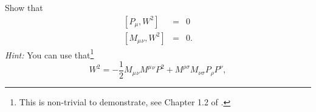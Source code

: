 \documentclass[notes.tex]{subfiles}
\begin{document}
\begin{Exercise}[]
Show that
\begin{eqnarray}
\left[P_\mu, W^2\right] &=& 0 \\
\left[M_\mu{}_\nu, W^2\right] &=& 0.
\end{eqnarray}
{\it Hint:} You can use that\footnote{This is non-trivial to demonstrate, see Chapter 1.2 of \cite{IntrSUSY2010}.}
 \[W^2 = -\frac{1}{2} M_\mu{}_\nu M^{\mu}{}^{\nu}P^2 + M^{\rho\sigma}M_{\nu\sigma}P_\rho P^\nu, \]
\end{Exercise}


\end{document}

